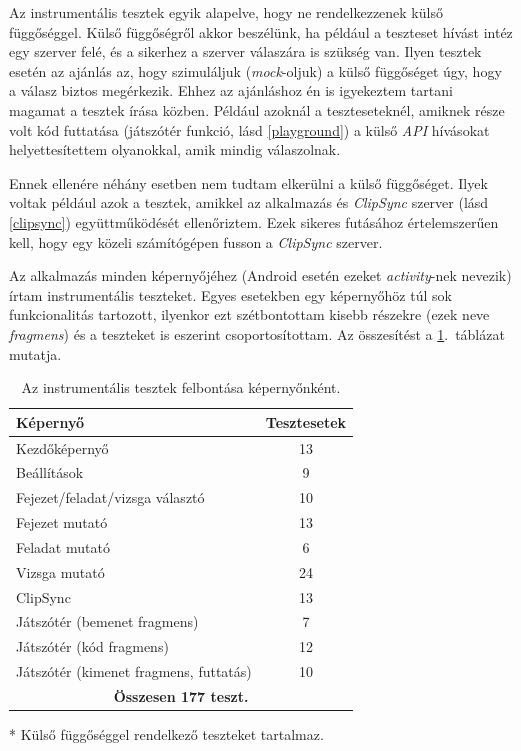 \documentclass[12pt,a4paper]{article}
\begin{document}
	 Az instrumentális tesztek egyik alapelve, hogy ne rendelkezzenek külső függőséggel. Külső függőségről akkor beszélünk, ha például a teszteset hívást intéz egy szerver felé, és a sikerhez a szerver válaszára is szükség van. Ilyen tesztek esetén az ajánlás az, hogy szimuláljuk (\textit{mock}-oljuk) a külső függőséget úgy, hogy a válasz biztos megérkezik. Ehhez az ajánláshoz én is igyekeztem tartani magamat a tesztek írása közben. Például azoknál a teszteseteknél, amiknek része volt kód futtatása (játszótér funkció, lásd \ref{playground}) a külső \textit{API} hívásokat helyettesítettem olyanokkal, amik mindig válaszolnak. 
	 
	 Ennek ellenére néhány esetben nem tudtam elkerülni a külső függőséget. Ilyek voltak például azok a tesztek, amikkel az alkalmazás és \textit{ClipSync} szerver (lásd \ref{clipsync}) együttműködését ellenőriztem. Ezek sikeres futásához értelemszerűen kell, hogy egy közeli számítógépen fusson a \textit{ClipSync} szerver.
	
	 Az alkalmazás minden képernyőjéhez (Android esetén ezeket \textit{activity}-nek nevezik) írtam instrumentális teszteket. Egyes esetekben egy képernyőhöz túl sok funkcionalitás tartozott, ilyenkor ezt szétbontottam kisebb részekre (ezek neve \textit{fragmens}) és a teszteket is eszerint csoportosítottam. Az összesítést a \ref{table_test_summary}.\ táblázat mutatja. 
	
	\bigskip
	\begin{table}[h!]
		\centering
			\begin{threeparttable}
			\begin{tabular}{|l|c|}
				\hline
				\textbf{Képernyő} & \textbf{Tesztesetek} \\
				\hline
				Kezdőképernyő & 13 \\
				\hline
				Beállítások & 9 \\
				\hline
				Fejezet/feladat/vizsga választó & 10 \\
				\hline
				Fejezet mutató & 13 \\
				\hline
				Feladat mutató & 6 \\
				\hline
				Vizsga mutató & 24 \\
				\hline
				ClipSync & 13\tnote{*} \\
				\hline
				Játszótér (bemenet fragmens) & 7 \\
				\hline
				Játszótér (kód fragmens) & 12 \\
				\hline
				Játszótér (kimenet fragmens, futtatás) & 10 \\
				\hline
				\multicolumn{2}{|c|}{\textbf{Összesen 177 teszt.}}\\
				\hline
			\end{tabular}
			\begin{tablenotes}
				\item[*] Külső függőséggel rendelkező teszteket tartalmaz.
			\end{tablenotes}
		\end{threeparttable}
		\caption{Az instrumentális tesztek felbontása képernyőnként.}
		\label{table_test_summary}
	\end{table}
\end{document}
